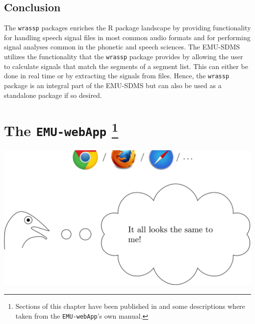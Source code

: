 \documentclass[]{book}
\let\rmarkdownfootnote\footnote%
\def\footnote{\protect\rmarkdownfootnote}
\begin{document}
\hypertarget{conclusion-4}{%
\section{Conclusion}\label{conclusion-4}}

The \texttt{wrassp} packages enriches the R package landscape by providing functionality for handling speech signal files in most common audio formats and for performing signal analyses common in the phonetic and speech sciences. The EMU-SDMS utilizes the functionality that the \texttt{wrassp} package provides by allowing the user to calculate signals that match the segments of a segment list. This can either be done in real time or by extracting the signals from files. Hence, the \texttt{wrassp} package is an integral part of the EMU-SDMS but can also be used as a standalone package if so desired.

\hypertarget{chap:emu-webApp}{%
\chapter[The \texttt{EMU-webApp} ]{\texorpdfstring{The \texttt{EMU-webApp} \footnote{Sections of this chapter have been published in \citep{winkelmann:2015d} and some descriptions where taken from the \texttt{EMU-webApp}'s own manual.}}{The EMU-webApp }}\label{chap:emu-webApp}}

\begin{center}\includegraphics[width=0.75\linewidth]{pics/EMU-webAppEmu_emu-webApp} \end{center}
\end{document}
